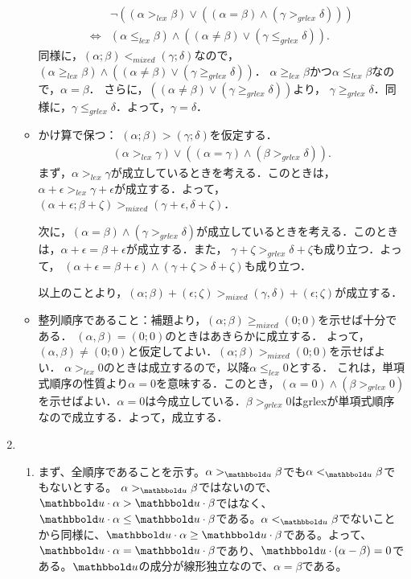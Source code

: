 \documentclass[9pt]{ltjsarticle}
\newcommand{\bbold}{\mathbbold}
\begin{document}
\begin{enumerate}[label=(問題\arabic*)]
\begin{itemize}
\begin{align}
& \neg ((\alpha >_{lex} \beta) \lor ((\alpha = \beta) \land (\gamma >_{grlex} \delta)))\\
 \iff&
(\alpha \le_{lex} \beta) \land ((\alpha \neq \beta) \lor (\gamma \le_{grlex}\delta)).
\end{align}
同様に，$(\alpha;\beta)<_{mixed}(\gamma;\delta)$なので，$(\alpha \ge_{lex}\beta)\land ((\alpha\neq \beta)\lor (\gamma \ge_{grlex} \delta))$．
$\alpha \ge_{lex} \beta$かつ$\alpha \le_{lex}\beta$なので，$\alpha = \beta$．
さらに，$((\alpha\neq \beta)\lor (\gamma \ge_{grlex}\delta))$より，
$\gamma \ge_{grlex}\delta$．同様に，$\gamma \le_{grlex}\delta$．よって，$\gamma=\delta$．
 \item かけ算で保つ：
$(\alpha;\beta)>(\gamma;\delta)$を仮定する．
\begin{align}
 (\alpha >_{lex} \gamma) \lor ((\alpha = \gamma )\land (\beta >_{grlex} \delta)).
\end{align}
まず，$\alpha >_{lex}\gamma$が成立しているときを考える．このときは，
$\alpha + \epsilon >_{lex} \gamma + \epsilon$が成立する．よって，
$(\alpha+\epsilon ; \beta + \zeta) >_{mixed} (\gamma+\epsilon, \delta+\zeta)$．

次に，$(\alpha = \beta) \land (\gamma >_{grlex} \delta)$が成立しているときを考える．このときは，$\alpha + \epsilon = \beta + \epsilon$が成立する．また，
$\gamma + \zeta >_{grlex} \delta+\zeta$も成り立つ．よって，
$(\alpha + \epsilon = \beta + \epsilon) \land(\gamma + \zeta > \delta + \zeta)$も成り立つ．

以上のことより，$(\alpha;\beta) + (\epsilon;\zeta) >_{mixed} (\gamma,\delta) + (\epsilon;\zeta)$が成立する．
 \item 整列順序であること：補題より，$(\alpha;\beta) \ge_{mixed} (0;0)$を示せば十分である．
$(\alpha,\beta)=(0;0)$のときはあきらかに成立する．
よって，$(\alpha,\beta)\neq (0;0)$と仮定してよい．$(\alpha;\beta) >_{mixed} (0;0)$を示せばよい．
$\alpha >_{lex} 0$のときは成立するので，以降$\alpha \le_{lex} 0$とする．
これは，単項式順序の性質より$\alpha = 0$を意味する．このとき，$(\alpha = 0) \land (\beta >_{grlex} 0) $を示せばよい．$\alpha = 0$は今成立している．$\beta >_{grlex} 0$はgrlexが単項式順序なので成立する．よって，成立する．
\end{itemize}
 \item
 \begin{enumerate}[label=(\alph*)]
   \item まず、全順序であることを示す。$\alpha >_{\bbold u} \beta$でも$\alpha <_{\bbold u} \beta$でもないとする。
   $\alpha >_{\bbold u} \beta$ではないので、$\bbold u\cdot \alpha > \bbold u \cdot \beta$ではなく、$\bbold u\cdot \alpha \le \bbold u\cdot \beta$である。$\alpha <_{\bbold u}\beta$でないことから同様に、$\bbold u\cdot \alpha \ge \bbold u\cdot \beta$である。よって、
   $\bbold u\cdot \alpha = \bbold u\cdot \beta$であり、$\bbold u\cdot (\alpha -\beta) = 0$である。$\bbold u$の成分が線形独立なので、$\alpha  = \beta$である。


\end{enumerate}
\end{enumerate}
\end{document}

